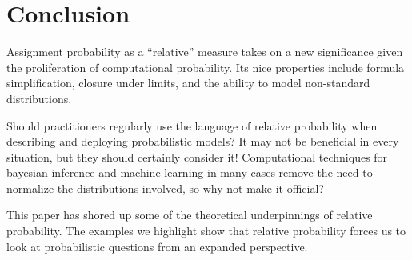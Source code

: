 \documentclass[twoside]{article}
\newcommand{\quotes}[1]{``#1''}
\theoremstyle{plain}%
\theoremstyle{definition}
\theoremstyle{remark}
\begin{document}
\section{Conclusion}

Assignment probability as a \quotes{relative} measure takes on a new significance given the proliferation of computational probability. Its nice properties include formula simplification, closure under limits, and the ability to model non-standard distributions.

Should practitioners regularly use the language of relative probability when describing and deploying probabilistic models? It may not be beneficial in every situation, but they should certainly consider it! Computational techniques for bayesian inference and machine learning in many cases remove the need to normalize the distributions involved, so why not make it official?

This paper has shored up some of the theoretical underpinnings of relative probability. The examples we highlight show that relative probability forces us to look at probabilistic questions from an expanded perspective.
\end{document}

